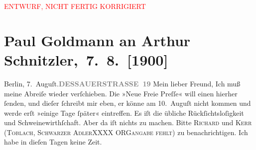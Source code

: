 
\begin{center}
            \textcolor{red}{ENTWURF, NICHT FERTIG KORRIGIERT}
                      \end{center}
            
         
         \renewcommand{\erwaehntePersonen}{Personen: Richard Beer-Hofmann, Georg Brandes, Alfred Kerr}
         \renewcommand{\erwaehnteInstitutionen}{Institutionen: Neue Freie Presse}
         \renewcommand{\erwaehnteOrte}{Orte: Bad Ischl, Berlin, Dessauer Straße, Toblach}
         \renewcommand{\erwaehnteWerke}{}
               \section[ Paul Goldmann an Arthur Schnitzler, 7. 8. {[}1900{]}]{ Paul Goldmann an Arthur Schnitzler, 7. 8. {[}1900{]}}\nopagebreak{}\rehead{ }\begin{ledgroupsized}[t]{13cm}\normalsize\beginnumbering \toendnotes[C]{\smallbreak\pagebreak[2]} 
\toendnotes[C]{\smallbreak}\pstart
           \noindent{}{\pb}Berlin, 7. Auguſt.\hfill \textcolor{gray}{\textbf{DESSAUERSTRASSE 19}}\pend
           \pstart
           \centering{}Mein lieber Freund,\pend
           \pstart
           \noindent{}Ich muß meine Abreiſe wieder verſchieben. Die »Neue
                  Freie Preſſe« will einen \label{K_L02927-1v}\label{K_L02927-1h}
               hierher ſenden, und dieſer ſchreibt mir eben, er könne am 10. Auguſt nicht kommen und werde erſt »einige Tage ſpäter« eintreffen.
                   Es iſt die  übliche Rückſichtsloſigkeit und Schweinewirthſchaft. Aber da iſt nichts zu
               machen. {\pb}Bitte \textsc{Richard} und \textsc{Kerr} (\textsc{Toblach}, \textsc{Schwarzer AdlerXXXX ORGangabe fehlt}) zu benachrichtigen. Ich habe in dieſen Tagen keine Zeit.\pend

\end{ledgroupsized}
